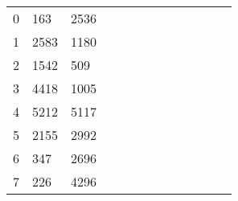 \begin{table}[tb]
\begin{tabular}{|l|l|l|llllllllll}
		0  & 163  & 2536 &                           &                           &                           &                           &                           &                           &                           &                           &                           &                           \\ \cline{1-3}
		1  & 2583 & 1180 &                           &                           &                           &                           &                           &                           &                           &                           &                           &                           \\ \cline{1-3}
		2  & 1542 & 509  &                           &                           &                           &                           &                           &                           &                           &                           &                           &                           \\ \cline{1-3}
		3  & 4418 & 1005 &                           &                           &                           &                           &                           &                           &                           &                           &                           &                           \\ \cline{1-3}
		4  & 5212 & 5117 &                           &                           &                           &                           &                           &                           &                           &                           &                           &                           \\ \cline{1-3}
		5  & 2155 & 2992 &                           &                           &                           &                           &                           &                           &                           &                           &                           &                           \\ \cline{1-3}
		6  & 347  & 2696 &                           &                           &                           &                           &                           &                           &                           &                           &                           &                           \\ \cline{1-3}
		7  & 226  & 4296 &                           &                           &                           &                           &                           &                           &                           &                           &                           &                           \\ \cline{1-3}

\end{tabular}
\end{table}

